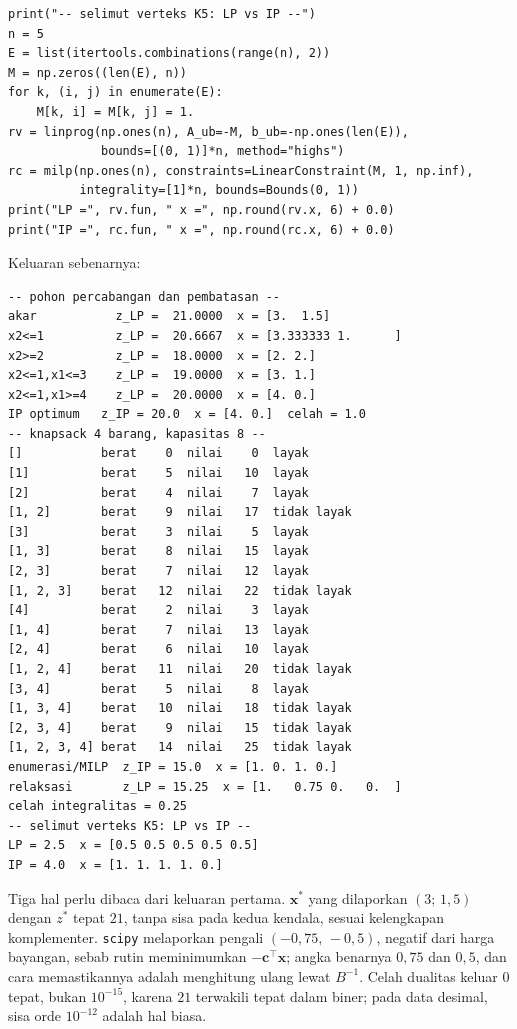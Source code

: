 \begin{lab}
\begin{verbatim}
print("-- selimut verteks K5: LP vs IP --")
n = 5
E = list(itertools.combinations(range(n), 2))
M = np.zeros((len(E), n))
for k, (i, j) in enumerate(E):
    M[k, i] = M[k, j] = 1.
rv = linprog(np.ones(n), A_ub=-M, b_ub=-np.ones(len(E)),
             bounds=[(0, 1)]*n, method="highs")
rc = milp(np.ones(n), constraints=LinearConstraint(M, 1, np.inf),
          integrality=[1]*n, bounds=Bounds(0, 1))
print("LP =", rv.fun, " x =", np.round(rv.x, 6) + 0.0)
print("IP =", rc.fun, " x =", np.round(rc.x, 6) + 0.0)
\end{verbatim}
Keluaran sebenarnya:
\begin{verbatim}
-- pohon percabangan dan pembatasan --
akar           z_LP =  21.0000  x = [3.  1.5]
x2<=1          z_LP =  20.6667  x = [3.333333 1.      ]
x2>=2          z_LP =  18.0000  x = [2. 2.]
x2<=1,x1<=3    z_LP =  19.0000  x = [3. 1.]
x2<=1,x1>=4    z_LP =  20.0000  x = [4. 0.]
IP optimum   z_IP = 20.0  x = [4. 0.]  celah = 1.0
-- knapsack 4 barang, kapasitas 8 --
[]           berat    0  nilai    0  layak
[1]          berat    5  nilai   10  layak
[2]          berat    4  nilai    7  layak
[1, 2]       berat    9  nilai   17  tidak layak
[3]          berat    3  nilai    5  layak
[1, 3]       berat    8  nilai   15  layak
[2, 3]       berat    7  nilai   12  layak
[1, 2, 3]    berat   12  nilai   22  tidak layak
[4]          berat    2  nilai    3  layak
[1, 4]       berat    7  nilai   13  layak
[2, 4]       berat    6  nilai   10  layak
[1, 2, 4]    berat   11  nilai   20  tidak layak
[3, 4]       berat    5  nilai    8  layak
[1, 3, 4]    berat   10  nilai   18  tidak layak
[2, 3, 4]    berat    9  nilai   15  tidak layak
[1, 2, 3, 4] berat   14  nilai   25  tidak layak
enumerasi/MILP  z_IP = 15.0  x = [1. 0. 1. 0.]
relaksasi       z_LP = 15.25  x = [1.   0.75 0.   0.  ]
celah integralitas = 0.25
-- selimut verteks K5: LP vs IP --
LP = 2.5  x = [0.5 0.5 0.5 0.5 0.5]
IP = 4.0  x = [1. 1. 1. 1. 0.]
\end{verbatim}
\end{lab}

Tiga hal perlu dibaca dari keluaran pertama. $\mathbf{x}^{*}$ yang dilaporkan
$(3;\,1{,}5)$ dengan $z^{*}$ tepat $21$, tanpa sisa pada kedua kendala, sesuai kelengkapan
komplementer. \texttt{scipy} melaporkan pengali $(-0{,}75,\,-0{,}5)$, negatif dari harga
bayangan, sebab rutin meminimumkan $-\mathbf{c}^{\top}\mathbf{x}$; angka benarnya $0{,}75$
dan $0{,}5$, dan cara memastikannya adalah menghitung ulang lewat $B^{-1}$. Celah dualitas
keluar $0$ tepat, bukan $10^{-15}$, karena $21$ terwakili tepat dalam biner; pada data
desimal, sisa orde $10^{-12}$ adalah hal biasa.

